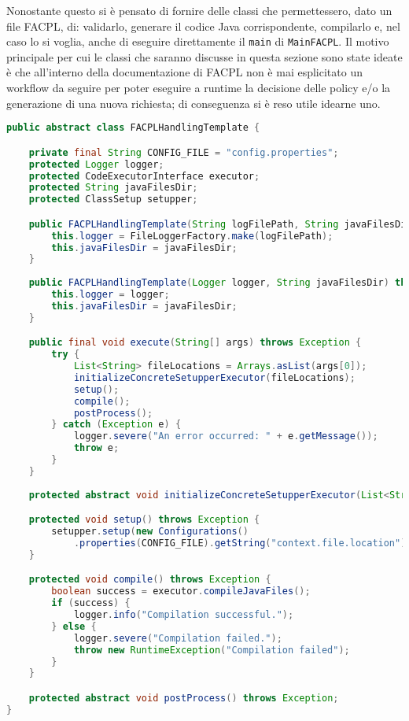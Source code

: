 Nonostante questo si è pensato di fornire delle classi che permettessero, dato un file FACPL, di: validarlo, generare il codice Java corrispondente, compilarlo e, nel caso lo si voglia, anche di eseguire direttamente il \texttt{main} di \texttt{MainFACPL}. Il motivo principale per cui le classi che saranno discusse in questa sezione sono state ideate è che all'interno della documentazione di FACPL non è mai esplicitato un workflow da seguire per poter eseguire a runtime la decisione delle policy e/o la generazione di una nuova richiesta; di conseguenza si è reso utile idearne uno.
\begin{lstlisting}[language=Java, caption=Classe FACPLHandlingTemplate, label=code:FACPLHandlingTemplate, basicstyle=\fontsize{8.5}{10}\ttfamily]
public abstract class FACPLHandlingTemplate {

	private final String CONFIG_FILE = "config.properties";
    protected Logger logger;
    protected CodeExecutorInterface executor;
    protected String javaFilesDir;
    protected ClassSetup setupper;

    public FACPLHandlingTemplate(String logFilePath, String javaFilesDir) throws IOException {
        this.logger = FileLoggerFactory.make(logFilePath);
        this.javaFilesDir = javaFilesDir;
    }
    
    public FACPLHandlingTemplate(Logger logger, String javaFilesDir) throws IOException {
        this.logger = logger;
        this.javaFilesDir = javaFilesDir;
    }

    public final void execute(String[] args) throws Exception {
        try {
            List<String> fileLocations = Arrays.asList(args[0]);
            initializeConcreteSetupperExecutor(fileLocations);
            setup();
            compile();
            postProcess();
        } catch (Exception e) {
            logger.severe("An error occurred: " + e.getMessage());
            throw e;
        }
    }
    
    protected abstract void initializeConcreteSetupperExecutor(List<String> fileLocations) throws Exception;

    protected void setup() throws Exception {
        setupper.setup(new Configurations()
            .properties(CONFIG_FILE).getString("context.file.location"), javaFilesDir);
    }

    protected void compile() throws Exception {
        boolean success = executor.compileJavaFiles();
        if (success) {
            logger.info("Compilation successful.");
        } else {
            logger.severe("Compilation failed.");
            throw new RuntimeException("Compilation failed");
        }
    }

    protected abstract void postProcess() throws Exception;
}
\end{lstlisting}
